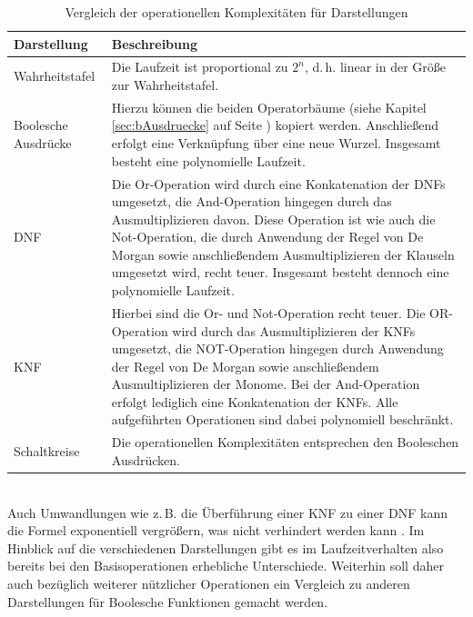 \begin{table}[bth]
	\centering
	\caption{Vergleich der operationellen Komplexitäten für Darstellungen}
	\label{tab:bop}
	\begin{tabular}{ | l | p{10.5cm} | }
		\hline
		\textbf{Darstellung} & \textbf{Beschreibung} \\ \hline
		Wahrheitstafel & Die Laufzeit ist proportional zu $2^n$, d.\,h. linear in der Größe zur Wahrheitstafel.\\ \hline
		Boolesche Ausdrücke & Hierzu können die beiden Operatorbäume (siehe Kapitel \ref{sec:bAusdruecke} auf Seite \pageref{sec:bAusdruecke}) kopiert werden. Anschließend erfolgt eine Verknüpfung über eine neue Wurzel. Insgesamt besteht eine polynomielle Laufzeit. \\ \hline
		DNF & Die Or-Operation wird durch eine Konkatenation der DNFs umgesetzt, die And-Operation hingegen durch das Ausmultiplizieren davon. Diese Operation ist wie auch die Not-Operation, die durch Anwendung der Regel von De Morgan sowie anschließendem Ausmultiplizieren der Klauseln umgesetzt wird, recht teuer. Insgesamt besteht dennoch eine polynomielle Laufzeit. \\ \hline
		KNF & Hierbei sind die Or- und Not-Operation recht teuer. Die OR-Operation wird durch das Ausmultiplizieren der KNFs umgesetzt, die NOT-Operation hingegen durch Anwendung der Regel von De Morgan sowie anschließendem Ausmultiplizieren der Monome. Bei der And-Operation erfolgt lediglich eine Konkatenation der KNFs. Alle aufgeführten Operationen sind dabei polynomiell beschränkt. \\ \hline
		Schaltkreise & Die operationellen Komplexitäten entsprechen den Booleschen Ausdrücken. \\ \hline
	\end{tabular}
\end{table}\\
\noindent 
Auch Umwandlungen wie z.\,B. die Überführung einer KNF zu einer DNF kann die Formel exponentiell vergrößern, was nicht verhindert werden kann \cite{s2010}. Im Hinblick auf die verschiedenen Darstellungen gibt es im Laufzeitverhalten also bereits bei den Basisoperationen erhebliche Unterschiede. Weiterhin soll daher auch bezüglich weiterer nützlicher Operationen ein Vergleich zu anderen Darstellungen für Boolesche Funktionen gemacht werden. 

